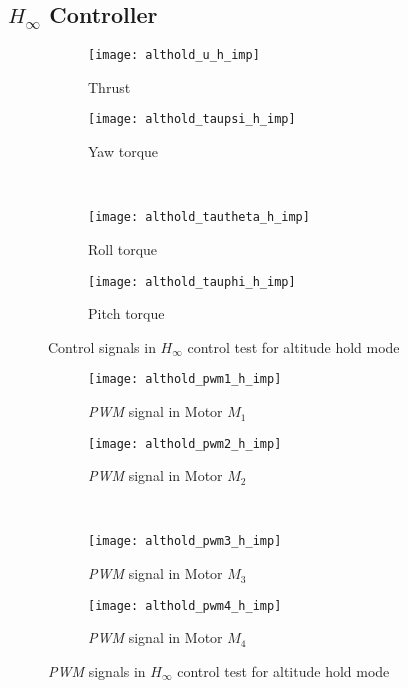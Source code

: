 \begin{appendices}
\subsection*{$H_\infty$ Controller}

\begin{figure}[H]
\begin{subfigure}{.5\linewidth}
\centering
\texttt{[image: althold\_u\_h\_imp]}
\caption{Thrust}
\label{fig:althold_u_h_imp}
\end{subfigure}%
\begin{subfigure}{.5\linewidth}
\centering
\texttt{[image: althold\_taupsi\_h\_imp]}
\caption{Yaw torque}
\label{fig:althold_taupsi_h_imp}
\end{subfigure}\\[1ex]
\begin{subfigure}{0.5\linewidth}
\centering
\texttt{[image: althold\_tautheta\_h\_imp]}
\caption{Roll torque}
\label{fig:althold_tautheta_h_imp}
\end{subfigure}
\begin{subfigure}{0.5\linewidth}
\centering
\texttt{[image: althold\_tauphi\_h\_imp]}
\caption{Pitch torque}
\label{fig:althold_tauphi_h_imp}
\end{subfigure}
\caption{Control signals in $H_\infty$ control test for altitude hold mode}
\label{fig:althold_control_h}
\end{figure}

\begin{figure}[H]
\begin{subfigure}{.5\linewidth}
\centering
\texttt{[image: althold\_pwm1\_h\_imp]}
\caption{\textit{PWM} signal in Motor $M_1$}
\label{fig:althold_pwm_h_imp}
\end{subfigure}%
\begin{subfigure}{.5\linewidth}
\centering
\texttt{[image: althold\_pwm2\_h\_imp]}
\caption{\textit{PWM} signal in Motor $M_2$}
\label{fig:althold_pwm2_h_imp}
\end{subfigure}\\[1ex]
\begin{subfigure}{0.5\linewidth}
\centering
\texttt{[image: althold\_pwm3\_h\_imp]}
\caption{\textit{PWM} signal in Motor $M_3$}
\label{fig:althold_pwm3_h_imp}
\end{subfigure}
\begin{subfigure}{0.5\linewidth}
\centering
\texttt{[image: althold\_pwm4\_h\_imp]}
\caption{\textit{PWM} signal in Motor $M_4$}
\label{fig:althold_pwm4_h_imp}
\end{subfigure}
\caption{\textit{PWM} signals in $H_\infty$ control test for altitude hold mode}
\label{fig:althold_pwm_h}
\end{figure}


\end{appendices}
